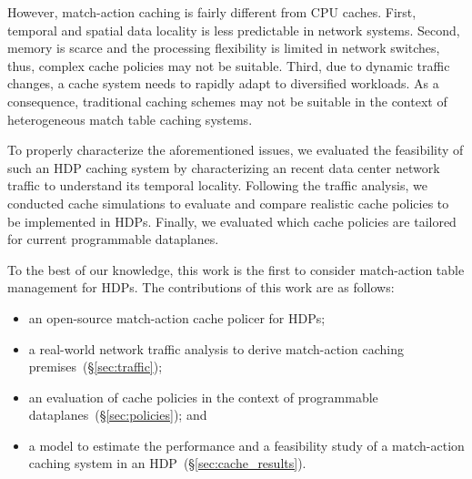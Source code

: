 However, match-action caching is fairly different from CPU caches.
First, temporal and spatial data locality is less predictable in network systems.
Second, memory is scarce and the processing flexibility is limited in network switches, thus, complex cache policies may not be suitable.
Third, due to dynamic traffic changes, a cache system needs to rapidly adapt to diversified workloads.
As a consequence, traditional caching schemes may not be suitable in the context of heterogeneous match table caching systems. 


To properly characterize the aforementioned issues, we evaluated the feasibility of such an HDP caching system by characterizing an recent data center network traffic to understand its temporal locality.
Following the traffic analysis, we conducted cache simulations to evaluate and compare realistic cache policies to be implemented in HDPs.
Finally, we evaluated which cache policies are tailored for current programmable dataplanes.%

To the best of our knowledge, this work is the first to consider match-action table management for HDPs.
The contributions of this work are as follows: 

\begin{itemize}[noitemsep,topsep=0pt]
	\item an open-source match-action cache policer for HDPs;
	\item a real-world network traffic analysis to derive match-action caching premises~(\S\ref{sec:traffic});
	\item an evaluation of cache policies in the context of programmable dataplanes~(\S\ref{sec:policies}); and
	\item a model to estimate the performance and a feasibility study of a match-action caching system in an HDP~(\S\ref{sec:cache_results}).
\end{itemize}


